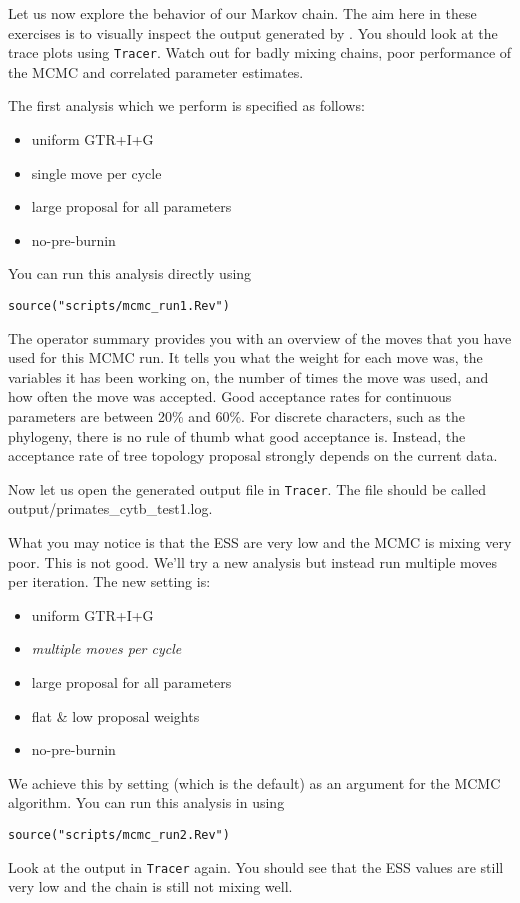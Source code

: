 Let us now explore the behavior of our Markov chain.
The aim here in these exercises is to visually inspect the output generated by \RevBayes.
You should look at the trace plots using \verb!Tracer!.
Watch out for badly mixing chains, poor performance of the MCMC and correlated parameter estimates.


The first analysis which we perform is specified as follows:
\begin{itemize}
\item{uniform GTR+I+G}
\item{single move per cycle}
\item{large proposal for all parameters}
\item{no-pre-burnin}
\end{itemize}
You can run this analysis directly using
{\tt \begin{snugshade*}
\begin{lstlisting}
source("scripts/mcmc_run1.Rev")
\end{lstlisting}
\end{snugshade*}}
The operator summary provides you with an overview of the moves that you have used for this MCMC run.
It tells you what the weight for each move was, the variables it has been working on, the number of times the move was used, and how often the move was accepted.
Good acceptance rates for continuous parameters are between 20\% and 60\%.
For discrete characters, such as the phylogeny, there is no rule of thumb what good acceptance is.
Instead, the acceptance rate of tree topology proposal strongly depends on the current data.

Now let us open the generated output file in \verb!Tracer!.
The file should be called output/primates\_cytb\_test1.log.

What you may notice is that the ESS are very low and the MCMC is mixing very poor.
This is not good. 
We'll try a new analysis but instead run multiple moves per iteration.
The new setting is:
\begin{itemize}
\item{uniform GTR+I+G}
\item{\it multiple moves per cycle}
\item{large proposal for all parameters}
\item{flat \& low proposal weights}
\item{no-pre-burnin}
\end{itemize}
We achieve this by setting  (which is the default) as an argument for the MCMC algorithm.
You can run this analysis in \RevBayes using
{\tt \begin{snugshade*}
\begin{lstlisting}
source("scripts/mcmc_run2.Rev")
\end{lstlisting}
\end{snugshade*}}
Look at the output in \verb!Tracer! again.
You should see that the ESS values are still very low and the chain is still not mixing well.

